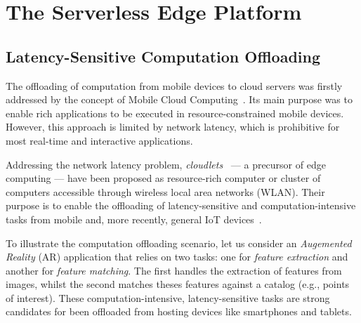 \section{The Serverless Edge Platform}\label{sec:SEP}

\subsection{Latency-Sensitive Computation Offloading}\label{sec:SEP_MCO}



The offloading of computation from mobile devices to cloud servers was firstly addressed by the concept of Mobile Cloud Computing~\cite{Khan:14}. Its main purpose was to enable rich applications to be executed in resource-constrained mobile devices. However, this approach is limited by network latency, which is prohibitive for most real-time and interactive applications.

Addressing the network latency problem, \textit{cloudlets}~\cite{Satyanarayanan:2009} --- a precursor of edge computing --- have been proposed as resource-rich computer or cluster of computers  accessible through wireless local area networks (WLAN). Their purpose is to enable the offloading of latency-sensitive and computation-intensive tasks from mobile and, more recently, general IoT devices~\cite{Satyanarayanan:2017}. 





To illustrate the computation offloading scenario, let us consider an \textit{Augemented Reality} (AR) application that relies on two tasks: one for \textit{feature extraction} and another for \textit{feature matching}. The first handles the extraction of features from images, whilst the second matches theses features against a catalog (e.g., points of interest). 
These computation-intensive, latency-sensitive tasks are strong candidates for been offloaded from hosting devices like smartphones and tablets.

